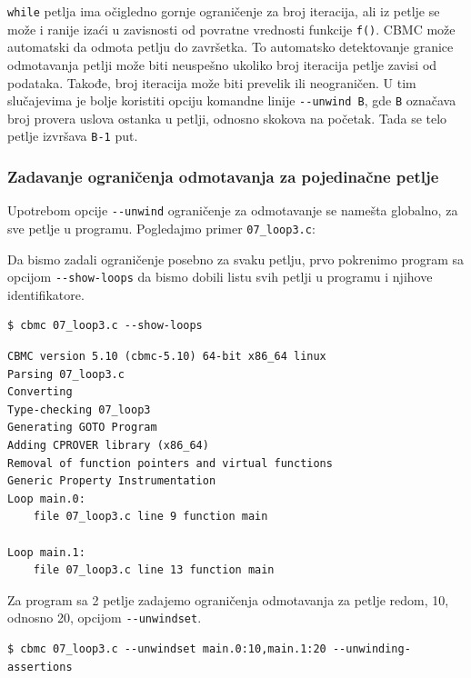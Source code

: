 
\texttt{while} petlja ima očigledno gornje ograničenje za broj iteracija, ali iz petlje se može i ranije izaći u zavisnosti od povratne vrednosti funkcije \texttt{f()}. CBMC može automatski da odmota petlju do završetka. To automatsko detektovanje granice odmotavanja petlji može biti neuspešno ukoliko broj iteracija petlje zavisi od podataka. Takođe, broj iteracija može biti prevelik ili neograničen. U tim slučajevima je bolje koristiti opciju komandne linije \texttt{-{}-unwind\ B}, gde \texttt{B} označava broj provera uslova ostanka u petlji, odnosno skokova na početak. Tada se telo petlje izvršava \texttt{B-1} put.

\subsubsection{Zadavanje ograničenja odmotavanja za pojedinačne petlje}\label{zadavanje-ograniux10denja-odmotavanja-za-pojedinaux10dne-petlje}

Upotrebom opcije \texttt{-{}-unwind} ograničenje za odmotavanje se namešta globalno, za sve petlje u programu. Pogledajmo primer \texttt{07\_loop3.c}:


Da bismo zadali ograničenje posebno za svaku petlju, prvo pokrenimo program sa opcijom \texttt{-{}-show-loops} da bismo dobili listu svih petlji u programu i njihove identifikatore.

\begin{verbatim}
$ cbmc 07_loop3.c --show-loops
\end{verbatim}

\begin{verbatim}
CBMC version 5.10 (cbmc-5.10) 64-bit x86_64 linux
Parsing 07_loop3.c
Converting
Type-checking 07_loop3
Generating GOTO Program
Adding CPROVER library (x86_64)
Removal of function pointers and virtual functions
Generic Property Instrumentation
Loop main.0:
    file 07_loop3.c line 9 function main

Loop main.1:
    file 07_loop3.c line 13 function main
\end{verbatim}

Za program sa 2 petlje zadajemo ograničenja odmotavanja za petlje redom, 10, odnosno 20, opcijom \texttt{-{}-unwindset}.

\begin{verbatim}
$ cbmc 07_loop3.c --unwindset main.0:10,main.1:20 --unwinding-assertions
\end{verbatim}

